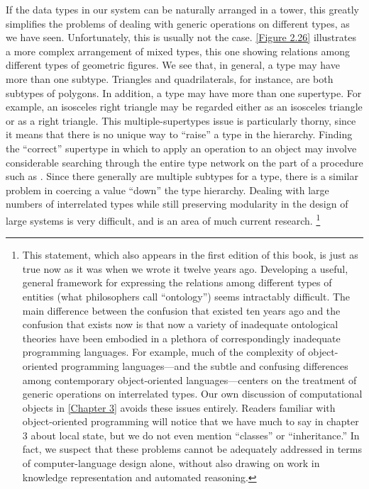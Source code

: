 If the data types in our system can be naturally arranged in a tower, this greatly simplifies the problems of dealing with generic operations on different types, as we have seen.
Unfortunately, this is usually not the case.
\cref{Figure 2.26} illustrates a more complex arrangement of mixed types, this one showing relations among different types of geometric figures.
We see that, in general, a type may have more than one subtype.
Triangles and quadrilaterals, for instance, are both subtypes of polygons.
In addition, a type may have more than one supertype.
For example, an isosceles right triangle may be regarded either as an isosceles triangle or as a right triangle.
This multiple-supertypes issue is particularly thorny, since it means that there is no unique way to “raise” a type in the hierarchy.
Finding the “correct” supertype in which to apply an operation to an object may involve considerable searching through the entire type network on the part of a procedure such as .
Since there generally are multiple subtypes for a type, there is a similar problem in coercing a value “down” the type hierarchy.
Dealing with large numbers of interrelated types while still preserving modularity in the design of large systems is very difficult, and is an area of much current research.%
\footnote{
	This statement, which also appears in the first edition of this book, is just as true now as it was when we wrote it twelve years ago.
	Developing a useful, general framework for expressing the relations among different types of entities (what philosophers call “ontology”) seems intractably difficult.
	The main difference between the confusion that existed ten years ago and the confusion that exists now is that now a variety of inadequate ontological theories have been embodied in a plethora of correspondingly inadequate programming languages.
	For example, much of the complexity of object-oriented programming languages---and the subtle and confusing differences among contemporary object-oriented languages---centers on the treatment of generic operations on interrelated types.
	Our own discussion of computational objects in \cref{Chapter 3} avoids these issues entirely.
	Readers familiar with object-oriented programming will notice that we have much to say in chapter 3 about local state, but we do not even mention “classes” or “inheritance.”
	In fact, we suspect that these problems cannot be adequately addressed in terms of computer-language design alone, without also drawing on work in knowledge representation and automated reasoning.
}



